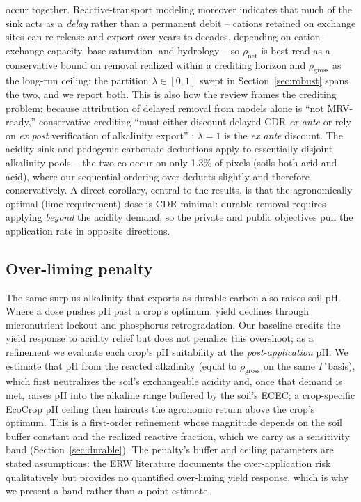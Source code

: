 \documentclass[12pt]{article}
\begin{document}
occur together. Reactive-transport modeling moreover indicates that much of the
sink acts as a \emph{delay} rather than a permanent debit -- cations retained on
exchange sites can re-release and export over years to decades, depending on
cation-exchange capacity, base saturation, and hydrology \citep{kanzaki2025} --
so $\rho_{\text{net}}$ is best read as a conservative bound on removal realized
within a crediting horizon and $\rho_{\text{gross}}$ as the long-run ceiling;
the partition $\lambda \in [0,1]$ swept in Section~\ref{sec:robust} spans the
two, and we report both. This is also how the review frames the crediting
problem: because attribution of delayed removal from models alone is ``not
MRV-ready,'' conservative crediting ``must either discount delayed CDR \emph{ex
ante} or rely on \emph{ex post} verification of alkalinity export''
\citep[\S3.4.6]{suhrhoff2026esroc}; $\lambda=1$ is the \emph{ex ante}
discount. The acidity-sink and pedogenic-carbonate deductions
apply to essentially disjoint alkalinity pools -- the two co-occur on only
1.3\% of pixels (soils both arid and acid), where our sequential ordering
over-deducts slightly and therefore conservatively. A direct corollary, central to the
results, is that the agronomically optimal (lime-requirement) dose is
CDR-minimal: durable removal requires applying \emph{beyond} the acidity demand,
so the private and public objectives pull the application rate in opposite
directions.

\subsection{Over-liming penalty}\label{sec:overlime}
The same surplus alkalinity that exports as durable carbon also raises soil pH.
Where a dose pushes pH past a crop's optimum, yield declines through micronutrient
lockout and phosphorus retrogradation. Our baseline credits the yield response to
acidity relief but does not penalize this overshoot; as a refinement we evaluate
each crop's pH suitability at the \emph{post-application} pH. We estimate that pH
from the reacted alkalinity (equal to $\rho_{\text{gross}}$ on the same $F$ basis),
which first neutralizes the soil's exchangeable acidity and, once that demand is
met, raises pH into the alkaline range buffered by the soil's ECEC; a crop-specific
EcoCrop pH ceiling then haircuts the agronomic return above the crop's optimum.
This is a first-order refinement whose magnitude depends on the soil buffer
constant and the realized reactive fraction, which we carry as a sensitivity band
(Section~\ref{sec:durable}). The penalty's buffer and ceiling parameters are
stated assumptions: the ERW literature documents the over-application risk
qualitatively \citep{swoboda2022} but provides no quantified over-liming yield
response, which is why we present a band rather than a point estimate.
\end{document}
